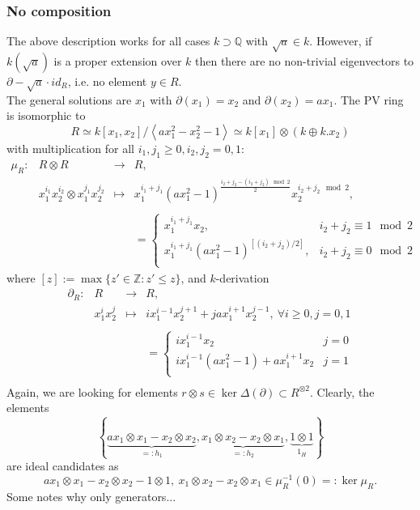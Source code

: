\documentclass[10pt,a4paper]{article}
\newcommand{\qz}{{\mathbb{Q}}}
\begin{document}
\subsubsection{No composition}
The above description works for all cases $k \supset \qz$ with $\sqrt{a} \in k$. However, if $k(\sqrt{a})$ is a proper extension over $k$ then there are no non-trivial eigenvectors to $\partial - \sqrt{a} \cdot id_R$, i.e. no element $y \in R$.\\
The general solutions are $x_1$ with $\partial(x_1) = x_2$ and $\partial(x_2) = a x_1$. The PV ring is isomorphic to
$$R \simeq k[x_1,x_2]/\left<a x_1^2 - x_2^2 - 1\right> \simeq k[x_1] \otimes (k \oplus k.x_2)$$
with multiplication for all $i_1, j_1 \geq 0, i_2, j_2 = 0, 1$:
$$\begin{array}{rrcl}
\mu_R :& R \otimes R &\longrightarrow& R,\\
& x_1^{i_1} x_2^{i_2} \otimes x_1^{j_1} x_2^{j_2} &\longmapsto &x_1^{i_1 + j_1} (a x_1^2 - 1)^{\frac{i_2+j_2 - (i_2+ j_2)\mod 2}{2}} x_2^{i_2+j_2 \mod 2},\\
&&&\\
&&& = \begin{cases}
x_1^{i_1 + j_1} x_2, & i_2 + j_2 \equiv 1 \mod 2\\
x_1^{i_1 + j_1} (a x_1^2 - 1)^{[(i_2+j_2)/2]}, & i_2 + j_2 \equiv 0 \mod 2\\
\end{cases}
\end{array}$$
where $[z] := \max \{z' \in \mathbb{Z} : z' \leq z\}$, and $k$-derivation
$$\begin{array}{rrcl}
\partial_R : &R& \longrightarrow &R,\\
&x_1^i x_2^j &\longmapsto &i x_1^{i-1} x_2^{j+1} + j a x_1^{i+1} x_2^{j-1},\ \forall i \geq 0, j = 0, 1\\
&&&\\
&&& = \begin{cases}
i x_1^{i-1} x_2 & j = 0\\
i x_1^{i-1} (a x_1^2 - 1) + a x_1^{i+1} x_2& j = 1\\
\end{cases}\\
\end{array}$$
Again, we are looking for elements $r \otimes s \in \ker \Delta(\partial) \subset R^{\otimes 2}$. Clearly, the elements
$$\left\{\underbrace{a x_1 \otimes x_1 - x_2 \otimes x_2}_{=: h_1}, \underbrace{x_1 \otimes x_2 - x_2 \otimes x_1}_{=: h_2}, \underbrace{1 \otimes 1}_{1_H}\right\}$$
are ideal candidates as
$$a x_1 \otimes x_1 - x_2 \otimes x_2 - 1 \otimes 1,\ x_1 \otimes x_2 - x_2 \otimes x_1 \in \mu_R^{-1}(0) =: \ker \mu_R.$$
Some notes why only generators...\\
\end{document}
